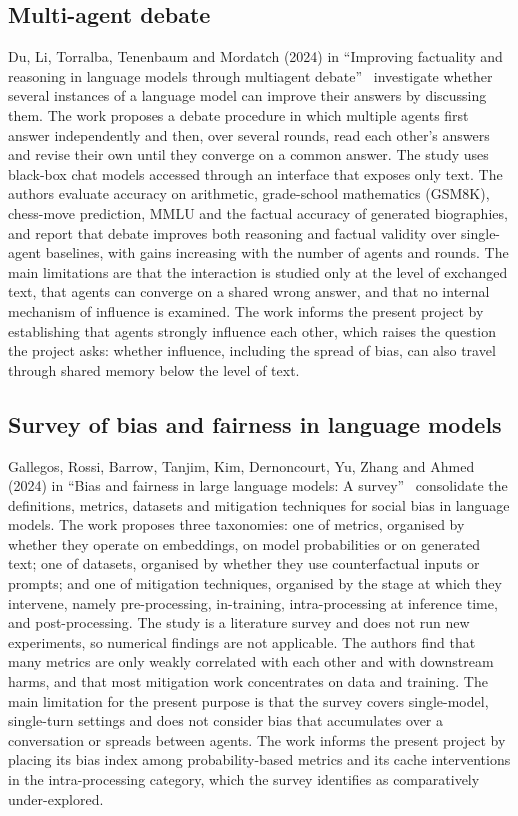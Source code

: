 \subsection{Multi-agent debate}\label{lit:debate}
Du, Li, Torralba, Tenenbaum and Mordatch (2024) in ``Improving factuality and reasoning in language models through multiagent debate''~\cite{du2024debate} investigate whether several instances of a language model can improve their answers by discussing them. The work proposes a debate procedure in which multiple agents first answer independently and then, over several rounds, read each other's answers and revise their own until they converge on a common answer. The study uses black-box chat models accessed through an interface that exposes only text. The authors evaluate accuracy on arithmetic, grade-school mathematics (GSM8K), chess-move prediction, MMLU and the factual accuracy of generated biographies, and report that debate improves both reasoning and factual validity over single-agent baselines, with gains increasing with the number of agents and rounds. The main limitations are that the interaction is studied only at the level of exchanged text, that agents can converge on a shared wrong answer, and that no internal mechanism of influence is examined. The work informs the present project by establishing that agents strongly influence each other, which raises the question the project asks: whether influence, including the spread of bias, can also travel through shared memory below the level of text.

\subsection{Survey of bias and fairness in language models}\label{lit:survey}
Gallegos, Rossi, Barrow, Tanjim, Kim, Dernoncourt, Yu, Zhang and Ahmed (2024) in ``Bias and fairness in large language models: A survey''~\cite{gallegos2024bias} consolidate the definitions, metrics, datasets and mitigation techniques for social bias in language models. The work proposes three taxonomies: one of metrics, organised by whether they operate on embeddings, on model probabilities or on generated text; one of datasets, organised by whether they use counterfactual inputs or prompts; and one of mitigation techniques, organised by the stage at which they intervene, namely pre-processing, in-training, intra-processing at inference time, and post-processing. The study is a literature survey and does not run new experiments, so numerical findings are not applicable. The authors find that many metrics are only weakly correlated with each other and with downstream harms, and that most mitigation work concentrates on data and training. The main limitation for the present purpose is that the survey covers single-model, single-turn settings and does not consider bias that accumulates over a conversation or spreads between agents. The work informs the present project by placing its bias index among probability-based metrics and its cache interventions in the intra-processing category, which the survey identifies as comparatively under-explored.

